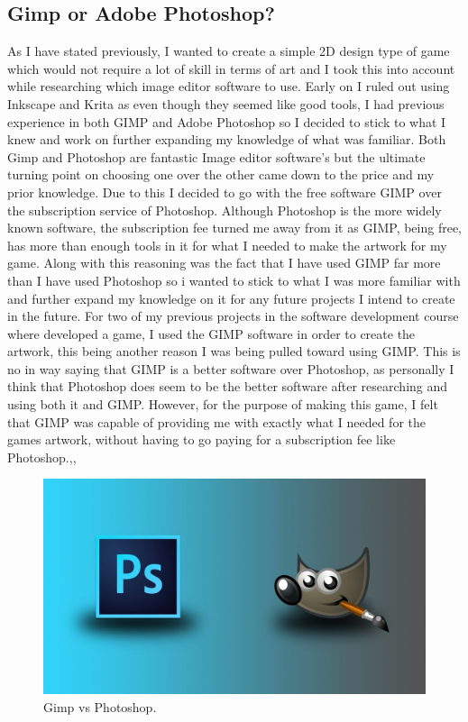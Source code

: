 \subsection{Gimp or Adobe Photoshop?}


As I have stated previously, I wanted to create a simple 2D design type of game which would not require a lot of skill in terms of art and I took this into account while researching which image editor software to use. Early on I ruled out using Inkscape and Krita as even though they seemed like good tools, I had previous experience in both GIMP and Adobe Photoshop so I decided to stick to what I knew and work on further expanding my knowledge of what was familiar. Both Gimp and Photoshop are fantastic Image editor software's but the ultimate turning point on choosing one over the other came down to the price and my prior knowledge.
Due to this I decided to go with the free software GIMP over the subscription service of Photoshop. Although Photoshop is the more widely known software, the subscription fee turned me away from it as GIMP, being free, has more than enough tools in it for what I needed to make the artwork for my game. Along with this reasoning was the fact that I have used GIMP far more than I have used Photoshop so i wanted to stick to what I was more familiar with and further expand my knowledge on it for any future projects I intend to create in the future. For two of my previous projects in the software development course where developed a game, I used the GIMP software in order to create the artwork, this being another reason I was being pulled toward using GIMP. This is no in way saying that GIMP is a better software over Photoshop, as personally I think that Photoshop does seem to be the better software after researching and using both it and GIMP. However, for the purpose of making this game, I felt that GIMP was capable of providing me with exactly what I needed for the games artwork, without having to go paying for a subscription fee like Photoshop.\cite{AdobePhotoshopVGIMP},\cite{GIMP},\cite{AdobePhotoshop}
\begin{figure}[h]
  \includegraphics[width=\linewidth]{Images/GimpVphotoshop.jpg}
  \caption{Gimp vs Photoshop.}
  \label{fig:GimpVPhoto}
\end{figure}


